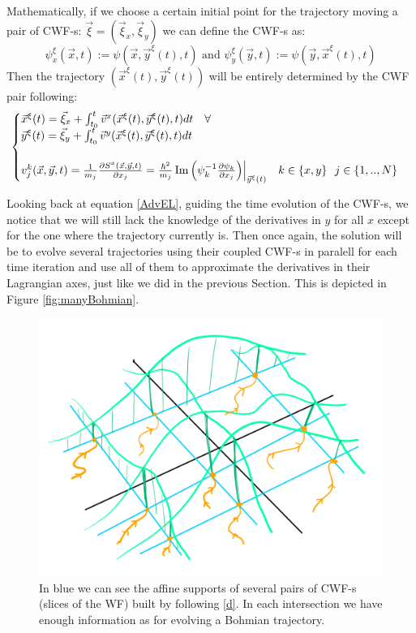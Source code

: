 \documentclass[11pt, a4paper]{article} %
\begin{document}
Mathematically, if we choose a certain initial point for the trajectory moving a pair of CWF-s: $\vec{\xi}=(\vec{\xi}_x, \vec{\xi}_y)$ we can define the CWF-s as:
\begin{equation}
\psi_x^\xi(\vec{x},t):=\psi(\vec{x}, \vec{y}^\xi(t),t) \text{  and  } \psi_y^\xi(\vec{y},t):=\psi(\vec{y}, \vec{x}^\xi(t),t)
\end{equation}
Then the trajectory $(\vec{x}^\xi(t), \vec{y}^\xi(t))$ will be entirely determined by the CWF pair following:
\begin{equation}
\begin{cases}\label{d}
\vec{x}^\xi(t)=\vec{\xi}_x +\int_{t_0}^t \vec{v}^x(\vec{x}^\xi(t), \vec{y} ^\xi(t),t)dt\quad \forall \\
\vec{y}^\xi(t)=\vec{\xi}_y+\int_{t_0}^t \vec{v}^y(\vec{x}^\xi(t), \vec{y}^\xi(t),t)dt\\ \\
v_j^k(\vec{x}, \vec{y},t)=\frac{1}{m_j}\pdv{S^x(\vec{x}, \vec{y},t)}{x_j}= \frac{\hbar^2}{m_j}\Im\qty( \psi_k^{-1} \pdv{\psi_k}{x_j})\Big\rvert_{\vec{y}^\xi(t)} \quad k\in\{ x,y\}\ \ j\in\{ 1,..,N\}
\end{cases}
\end{equation}

Looking back at equation \eqref{AdvEL}, guiding the time evolution of the CWF-s, we notice that we will still lack the knowledge of the derivatives in $y$ for all $x$ except for the one where the trajectory currently is. Then once again, the solution will be to evolve several trajectories using their coupled CWF-s in paralell for each time iteration and use all of them to approximate the derivatives in their Lagrangian axes, just like we did in the previous Section. This is depicted in Figure \ref{fig:manyBohmian}.

\begin{figure}[h!]
  \centering
    \includegraphics[width=0.65\linewidth]{many_bohmian.png}
  \caption{In blue we can see the affine supports of several pairs of CWF-s (slices of the WF) built by following \eqref{d}. In each intersection we have enough information as for evolving a Bohmian trajectory. }
  \label{fig:manyBohmain}
\end{figure}
\end{document}
